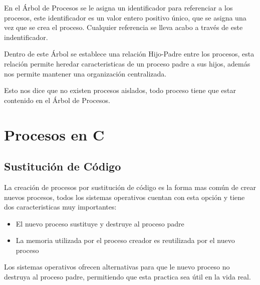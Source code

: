 \documentclass[12pt, fleqn]{report}                             %
\begin{document}
            En el Árbol de Procesos se le asigna un identificador para referenciar a los procesos, este
            identificador es un valor entero positivo único, que se asigna una vez que se crea el proceso.
            Cualquier referencia se lleva acabo a través de este indentificador.

            Dentro de este Árbol se establece una relación Hijo-Padre entre los procesos, esta relación 
            permite heredar caracteristicas de un proceso padre a sus hijos, además nos permite mantener
            una organización centralizada.

            Esto nos dice que no existen procesos aislados, todo proceso tiene que estar contenido en el
            Árbol de Procesos.

        \clearpage
        \section{Procesos en C}



            \subsection{Sustitución de Código}

                La creación de procesos por sustitución de código es la forma mas común de crear
                nuevos procesos, todos los sistemas operativos cuentan con esta opción y tiene 
                dos caracteristicas muy importantes:
                \begin{itemize}
                    \item El nuevo proceso sustituye y destruye al proceso padre
                    \item La memoria utilizada por el proceso creador es reutilizada por el nuevo
                    proceso
                \end{itemize}

                Los sistemas operativos ofrecen alternativas para que le nuevo proceso no destruya
                al proceso padre, permitiendo que esta practica sea útil en la vida real.
\end{document}
